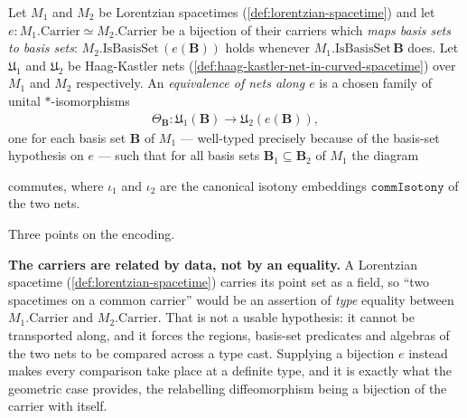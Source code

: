 \begin{definition}
    \label{def:net-equivalence-in-curved-spacetime}
    \leanok
    Let $M_1$ and $M_2$ be Lorentzian spacetimes (\ref{def:lorentzian-spacetime}) and let $e : M_1.\mathrm{Carrier} \simeq M_2.\mathrm{Carrier}$ be a bijection of their carriers which \emph{maps basis sets to basis sets}: $M_2.\mathrm{IsBasisSet}\,(e(\mathbf{B}))$ holds whenever $M_1.\mathrm{IsBasisSet}\,\mathbf{B}$ does. Let $\mathfrak{U}_1$ and $\mathfrak{U}_2$ be Haag-Kastler nets (\ref{def:haag-kastler-net-in-curved-spacetime}) over $M_1$ and $M_2$ respectively. An \emph{equivalence of nets along $e$} is a chosen family of unital $*$-isomorphisms
    \begin{align}
        \Theta_{\mathbf{B}} : \mathfrak{U}_1(\mathbf{B}) \longrightarrow \mathfrak{U}_2(e(\mathbf{B})),
    \end{align}
    one for each basis set $\mathbf{B}$ of $M_1$ --- well-typed precisely because of the basis-set hypothesis on $e$ --- such that for all basis sets $\mathbf{B}_1 \subseteq \mathbf{B}_2$ of $M_1$ the diagram

    \begin{center}
    \end{center}

    commutes, where $\iota_1$ and $\iota_2$ are the canonical isotony embeddings $\mathtt{commIsotony}$ of the two nets.

    Three points on the encoding.

    \textbf{The carriers are related by data, not by an equality.} A Lorentzian spacetime (\ref{def:lorentzian-spacetime}) carries its point set as a field, so ``two spacetimes on a common carrier'' would be an assertion of \emph{type} equality between $M_1.\mathrm{Carrier}$ and $M_2.\mathrm{Carrier}$. That is not a usable hypothesis: it cannot be transported along, and it forces the regions, basis-set predicates and algebras of the two nets to be compared across a type cast. Supplying a bijection $e$ instead makes every comparison take place at a definite type, and it is exactly what the geometric case provides, the relabelling diffeomorphism being a bijection of the carrier with itself.


\end{definition}
